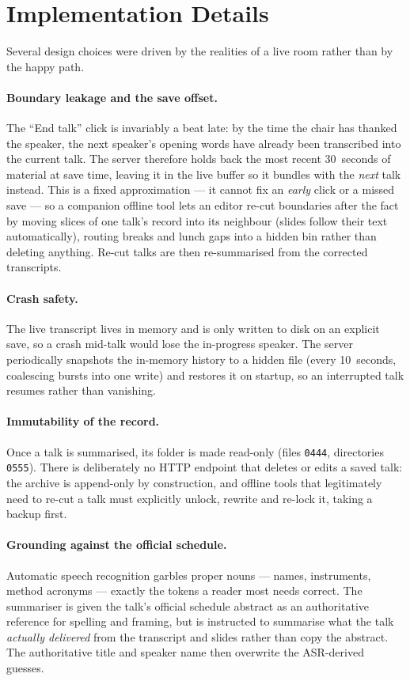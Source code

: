 \documentclass[11pt]{article}
\begin{document}
\section{Implementation Details}
Several design choices were driven by the realities of a live room rather than by
the happy path.

\paragraph{Boundary leakage and the save offset.}
The ``End talk'' click is invariably a beat late: by the time the chair has
thanked the speaker, the next speaker's opening words have already been
transcribed into the current talk. The server therefore holds back the most
recent 30~seconds of material at save time, leaving it in the live
buffer so it bundles with the \emph{next} talk instead. This is a fixed
approximation --- it cannot fix an \emph{early} click or a missed save --- so a
companion offline tool lets an editor re-cut boundaries after the fact by moving
slices of one talk's record into its neighbour (slides follow their text
automatically), routing breaks and lunch gaps into a hidden bin rather than
deleting anything. Re-cut talks are then re-summarised from the corrected
transcripts.

\paragraph{Crash safety.}
The live transcript lives in memory and is only written to disk on an explicit
save, so a crash mid-talk would lose the in-progress speaker. The server
periodically snapshots the in-memory history to a hidden file (every
10~seconds, coalescing bursts into one write) and restores it on startup,
so an interrupted talk resumes rather than vanishing.

\paragraph{Immutability of the record.}
Once a talk is summarised, its folder is made read-only (files \texttt{0444},
directories \texttt{0555}). There is deliberately no HTTP endpoint that deletes
or edits a saved talk: the archive is append-only by construction, and offline
tools that legitimately need to re-cut a talk must explicitly unlock, rewrite and
re-lock it, taking a backup first.

\paragraph{Grounding against the official schedule.}
Automatic speech recognition garbles proper nouns --- names, instruments,
method acronyms --- exactly the tokens a reader most needs correct. The
summariser is given the talk's official schedule abstract as an authoritative
reference for spelling and framing, but is instructed to summarise what the talk
\emph{actually delivered} from the transcript and slides rather than copy the
abstract. The authoritative title and speaker name then overwrite the
ASR-derived guesses.
\end{document}
